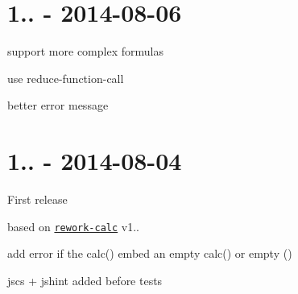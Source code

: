 \section*{1.. -\/ 2014-\/08-\/06}


\begin{DoxyItemize}
\item support more complex formulas
\item use {\ttfamily reduce-\/function-\/call}
\item better error message
\end{DoxyItemize}

\section*{1.. -\/ 2014-\/08-\/04}

First release


\begin{DoxyItemize}
\item based on \href{https://github.com/reworkcss/rework-calc}{\tt rework-\/calc} v1..
\item add error if the calc() embed an empty calc() or empty ()
\item jscs + jshint added before tests 
\end{DoxyItemize}